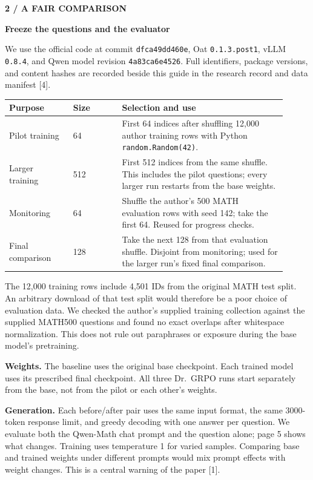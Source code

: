 \documentclass[11pt]{article}
\newcommand{\pagetitle}[2]{{\small\color{accent}\textbf{#1}}\par
  {\LARGE\color{ink}\textbf{#2}}\par\medskip}
\newcommand{\topic}[1]{\par\smallskip{\large\color{ink}\textbf{#1}}\par}
\newcommand{\code}[1]{\texttt{#1}}
\begin{document}
\newpage
\pagetitle{2 / A FAIR COMPARISON}{Freeze the questions and the evaluator}

We use the official code at commit \code{dfca49dd460e}, Oat
\code{0.1.3.post1}, vLLM \code{0.8.4}, and Qwen model revision
\code{4a83ca6e4526}. Full identifiers, package versions, and content hashes
are recorded beside this guide in the research record and data manifest [4].

\begin{tabular}{@{}p{0.21\linewidth}p{0.16\linewidth}p{0.54\linewidth}@{}}
\toprule
Purpose & Size & Selection and use \\
\midrule
Pilot training & 64 & First 64 indices after shuffling 12,000 author training
rows with Python \code{random.Random(42)}. \\
Larger training & 512 & First 512 indices from the same shuffle. This includes
the pilot questions; every larger run restarts from the base weights. \\
Monitoring & 64 & Shuffle the author's 500 MATH evaluation rows with seed 142;
take the first 64. Reused for progress checks. \\
Final comparison & 128 & Take the next 128 from that evaluation shuffle.
Disjoint from monitoring; used for the larger run's fixed final comparison. \\
\bottomrule
\end{tabular}

The 12,000 training rows include 4,501 IDs from the original MATH test split.
An arbitrary download of that test split would therefore be a poor choice of
evaluation data. We checked the author's supplied training collection against
the supplied MATH500 questions and found no exact overlaps after whitespace
normalization. This does not rule out paraphrases or exposure during the base
model's pretraining.

\topic{Keep three kinds of settings separate}

\textbf{Weights.} The baseline uses the original base checkpoint. Each trained
model uses its prescribed final checkpoint. All three Dr.\ GRPO runs start
separately from the base, not from the pilot or each other's weights.

\textbf{Generation.} Each before/after pair uses the same input format, the same
3000-token response limit, and greedy decoding with one answer per question.
We evaluate both the Qwen-Math chat prompt and the question alone; page 5 shows
what changes. Training uses temperature 1 for varied samples. Comparing base
and trained weights under different prompts would mix prompt effects with
weight changes. This is a central warning of the paper [1].
\end{document}
